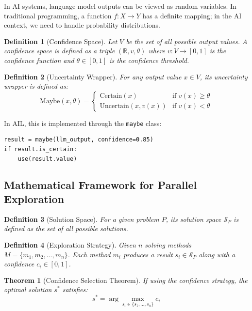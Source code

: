 \documentclass[12pt,a4paper]{article}
\begin{document}
In AI systems, language model outputs can be viewed as random variables. In traditional programming, a function $f: X \to Y$ has a definite mapping; in the AI context, we need to handle probability distributions.

\newtheorem*{definition}{Definition}
\begin{definition}[Confidence Space]
Let $V$ be the set of all possible output values. A confidence space is defined as a triple $(\mathbb{R}, v, \theta)$ where $v: V \to [0, 1]$ is the confidence function and $\theta \in [0, 1]$ is the confidence threshold.
\end{definition}

\begin{definition}[Uncertainty Wrapper]
For any output value $x \in V$, its uncertainty wrapper is defined as:
\begin{equation}
\text{Maybe}(x, \theta) = 
\begin{cases}
\text{Certain}(x) & \text{if } v(x) \geq \theta \\
\text{Uncertain}(x, v(x)) & \text{if } v(x) < \theta
\end{cases}
\end{equation}
\end{definition}

In AIL, this is implemented through the \texttt{maybe} class:

\begin{verbatim}
result = maybe(llm_output, confidence=0.85)
if result.is_certain:
    use(result.value)
\end{verbatim}

\subsection{Mathematical Framework for Parallel Exploration}

\newtheorem*{theorem}{Theorem}
\begin{definition}[Solution Space]
For a given problem $P$, its solution space $\mathcal{S}_P$ is defined as the set of all possible solutions.
\end{definition}

\begin{definition}[Exploration Strategy]
Given $n$ solving methods $M = \{m_1, m_2, ..., m_n\}$. Each method $m_i$ produces a result $s_i \in \mathcal{S}_P$ along with a confidence $c_i \in [0, 1]$.
\end{definition}

\begin{theorem}[Confidence Selection Theorem]
If using the confidence strategy, the optimal solution $s^*$ satisfies:
\begin{equation}
s^* = \arg\max_{s_i \in \{s_1, ..., s_n\}} c_i
\end{equation}
\end{theorem}
\end{document}
